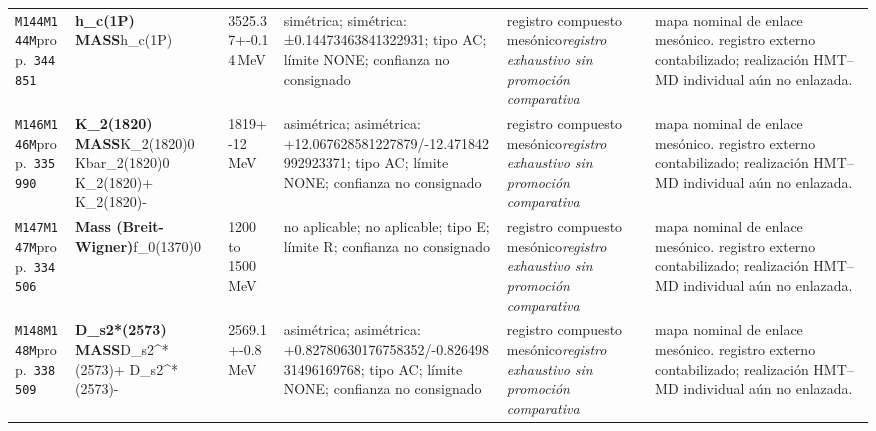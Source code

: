 \begin{landscape}
\begin{longtable}{L{1.85cm}L{4.45cm}L{2.35cm}L{4.05cm}L{3.35cm}L{7.15cm}}
\texttt{M144}\newline \texttt{M144M}\newline prop.\ \texttt{344851} & \textbf{h\_\allowbreak{}c(1P) MASS}\newline h\_\allowbreak{}c(1P) & 3525.37+-0.14\,MeV & simétrica; simétrica: ±0.14473463841322931; tipo AC; límite NONE; confianza no consignado & registro compuesto mesónico\newline \emph{registro exhaustivo sin promoción comparativa} & mapa nominal de enlace mesónico. registro externo contabilizado; realización HMT--MD individual aún no enlazada. \\
\texttt{M146}\newline \texttt{M146M}\newline prop.\ \texttt{335990} & \textbf{K\_\allowbreak{}2(1820) MASS}\newline K\_\allowbreak{}2(1820)0 \textbar{}\allowbreak{} Kbar\_\allowbreak{}2(1820)0 \textbar{}\allowbreak{} K\_\allowbreak{}2(1820)+ \textbar{}\allowbreak{} K\_\allowbreak{}2(1820)- & 1819+-12\,MeV & asimétrica; asimétrica: +12.067628581227879/-12.471842992923371; tipo AC; límite NONE; confianza no consignado & registro compuesto mesónico\newline \emph{registro exhaustivo sin promoción comparativa} & mapa nominal de enlace mesónico. registro externo contabilizado; realización HMT--MD individual aún no enlazada. \\
\texttt{M147}\newline \texttt{M147M}\newline prop.\ \texttt{334506} & \textbf{Mass (Breit-Wigner)}\newline f\_\allowbreak{}0(1370)0 & 1200 to 1500\,MeV & no aplicable; no aplicable; tipo E; límite R; confianza no consignado & registro compuesto mesónico\newline \emph{registro exhaustivo sin promoción comparativa} & mapa nominal de enlace mesónico. registro externo contabilizado; realización HMT--MD individual aún no enlazada. \\
\texttt{M148}\newline \texttt{M148M}\newline prop.\ \texttt{338509} & \textbf{D\_\allowbreak{}s2*(2573) MASS}\newline D\_\allowbreak{}s2\textasciicircum{}*(2573)+ \textbar{}\allowbreak{} D\_\allowbreak{}s2\textasciicircum{}*(2573)- & 2569.1+-0.8\,MeV & asimétrica; asimétrica: +0.82780630176758352/-0.82649831496169768; tipo AC; límite NONE; confianza no consignado & registro compuesto mesónico\newline \emph{registro exhaustivo sin promoción comparativa} & mapa nominal de enlace mesónico. registro externo contabilizado; realización HMT--MD individual aún no enlazada. \\

\end{longtable}
\end{landscape}
